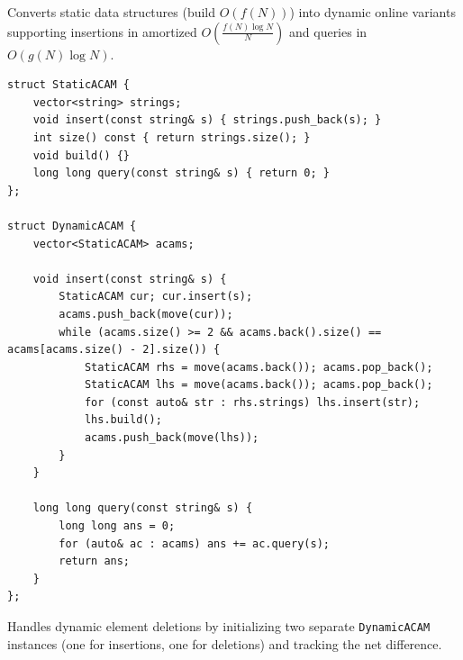 
Converts static data structures (build $O(f(N))$) into dynamic online variants supporting insertions in amortized $O(\frac{f(N) \log N}{N})$ and queries in $O(g(N) \log N)$.

\begin{lstlisting}
struct StaticACAM {
    vector<string> strings;
    void insert(const string& s) { strings.push_back(s); }
    int size() const { return strings.size(); }
    void build() {}
    long long query(const string& s) { return 0; }
};

struct DynamicACAM {
    vector<StaticACAM> acams;

    void insert(const string& s) {
        StaticACAM cur; cur.insert(s);
        acams.push_back(move(cur));
        while (acams.size() >= 2 && acams.back().size() == acams[acams.size() - 2].size()) {
            StaticACAM rhs = move(acams.back()); acams.pop_back();
            StaticACAM lhs = move(acams.back()); acams.pop_back();
            for (const auto& str : rhs.strings) lhs.insert(str);
            lhs.build();
            acams.push_back(move(lhs));
        }
    }

    long long query(const string& s) {
        long long ans = 0;
        for (auto& ac : acams) ans += ac.query(s);
        return ans;
    }
};
\end{lstlisting}

Handles dynamic element deletions by initializing two separate \lstinline|DynamicACAM| instances (one for insertions, one for deletions) and tracking the net difference.
